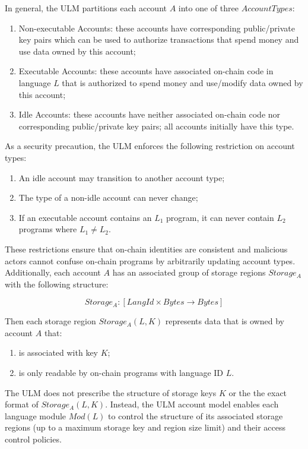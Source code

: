 \documentclass{article}
\newcommand{\ulm}{{ULM}}
\begin{document}
In general, the \ulm{} partitions each account $A$ into one of three $AccountTypes$:

\begin{enumerate}
    \item Non-executable Accounts: these accounts have corresponding public/private key pairs which can be used to authorize transactions that spend money and use data owned by this account;
    \item Executable Accounts: these accounts have associated on-chain code in language $L$ that is authorized to spend money and use/modify data owned by this account;
    \item Idle Accounts: these accounts have neither associated on-chain code nor corresponding public/private key pairs; all accounts initially have this type.
\end{enumerate}

\noindent As a security precaution, the \ulm{} enforces the following restriction on account types:

\begin{enumerate}
    \item An idle account may transition to another account type;
    \item The type of a non-idle account can never change;
    \item If an executable account contains an $L_1$ program, it can never contain $L_2$ programs where $L_1 \neq L_2$. 
\end{enumerate}

These restrictions ensure that on-chain identities are consistent and malicious actors cannot confuse on-chain programs by arbitrarily updating account types.
Additionally, each account $A$ has an associated group of storage regions $Storage_A$ with the following structure:

$$ Storage_A : [ LangId \times Bytes \rightarrow Bytes ] $$

\noindent Then each storage region $Storage_A(L, K)$ represents data that is owned by account $A$ that:

\begin{enumerate}
    \item is associated with key $K$;
    \item is only readable by on-chain programs with language ID $L$.
\end{enumerate}

The \ulm{} does not prescribe the structure of storage keys $K$ or the the exact format of $Storage_A(L,K)$.
Instead, the \ulm{} account model enables each language module $Mod(L)$ to control the structure of its associated storage regions (up to a maximum storage key and region size limit) and their access control policies.
\end{document}
